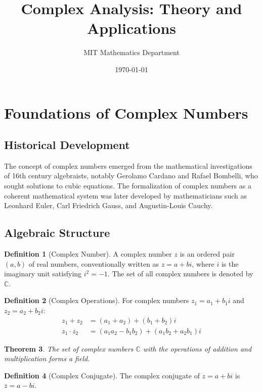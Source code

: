 \documentclass[12pt,a4paper]{article}
\title{Complex Analysis: Theory and Applications}
\author{MIT Mathematics Department}
\date{\today}
\theoremstyle{plain}
\newtheorem{theorem}{Theorem}[section]
\theoremstyle{definition}
\newtheorem{definition}[theorem]{Definition}
\begin{document}
\maketitle
\tableofcontents
\newpage

\section{Foundations of Complex Numbers}

\subsection{Historical Development}

The concept of complex numbers emerged from the mathematical investigations of 16th century algebraists, notably Gerolamo Cardano and Rafael Bombelli, who sought solutions to cubic equations. The formalization of complex numbers as a coherent mathematical system was later developed by mathematicians such as Leonhard Euler, Carl Friedrich Gauss, and Augustin-Louis Cauchy.

\subsection{Algebraic Structure}

\begin{definition}[Complex Number]
A complex number $z$ is an ordered pair $(a,b)$ of real numbers, conventionally written as $z = a + bi$, where $i$ is the imaginary unit satisfying $i^2 = -1$. The set of all complex numbers is denoted by $\mathbb{C}$.
\end{definition}

\begin{definition}[Complex Operations]
For complex numbers $z_1 = a_1 + b_1i$ and $z_2 = a_2 + b_2i$:
\begin{align}
z_1 + z_2 &= (a_1 + a_2) + (b_1 + b_2)i\\
z_1 \cdot z_2 &= (a_1a_2 - b_1b_2) + (a_1b_2 + a_2b_1)i
\end{align}
\end{definition}

\begin{theorem}
The set of complex numbers $\mathbb{C}$ with the operations of addition and multiplication forms a field.
\end{theorem}

\begin{definition}[Complex Conjugate]
The complex conjugate of $z = a + bi$ is $\overline{z} = a - bi$.
\end{definition}
\end{document}

